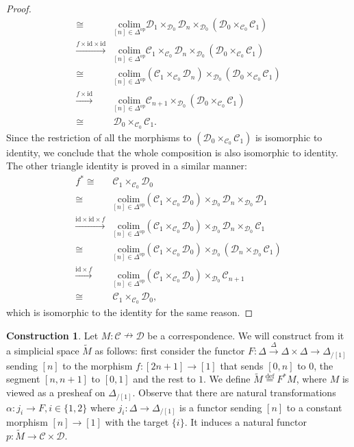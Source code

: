 \documentclass[a4paper, reqno]{amsart}
\theoremstyle{definition}
\newtheorem{construction}[theorem]{Construction}
\newcommand\cC{\mathscr C}
\newcommand\cD{\mathscr D}
\newcommand\id{\mathrm{id}}
\newcommand\op{\mathrm{op}}
\newcommand\colim{\mathrm{colim}}
\newcommand\bydef{\overset{\mathrm{def}}{=}}
\begin{document}
\begin{proof}
\begin{equation*}
\begin{split}
        \cong&\underset{[n]\in\Delta^\op}{\colim}\cD_1\times_{\cD_0}\cD_n\times_{\cD_0}(\cD_0\times_{\cC_0}\cC_1)\\
        \xrightarrow{f\times\id\times\id}&\underset{[n]\in\Delta^\op}{\colim}\cC_1\times_{\cC_0}\cD_n\times_{\cD_0}(\cD_0\times_{\cC_0}\cC_1)\\
        \cong&\underset{[n]\in\Delta^\op}{\colim}(\cC_1\times_{\cC_0}\cD_n)\times_{\cD_0}(\cD_0\times_{\cC_0}\cC_1)\\
        \xrightarrow{f\times\id}&\underset{[n]\in\Delta^\op}{\colim}\cC_{n+1}\times_{\cD_0}(\cD_0\times_{\cC_0}\cC_1)\\
        \cong &\cD_0\times_{\cC_0}\cC_1.
    \end{split}
\end{equation*}
Since the restriction of all the morphisms to $(\cD_0\times_{\cC_0}\cC_1)$ is isomorphic to identity, we conclude that the whole composition is also isomorphic to identity. The other triangle identity is proved in a similar manner:
\begin{equation*}
    \begin{split}
        f^*\cong&\cC_1\times_{\cC_0} \cD_0\\
        \cong&\underset{[n]\in\Delta^\op}{\colim}(\cC_1\times_{\cC_0} \cD_0)\times_{\cD_0}\cD_n\times_{\cD_0}\cD_1\\
        \xrightarrow{\id\times \id\times f}&\underset{[n]\in\Delta^\op}{\colim}(\cC_1\times_{\cC_0} \cD_0)\times_{\cD_0}\cD_n\times_{\cD_0}\cC_1\\
        \cong&\underset{[n]\in\Delta^\op}{\colim}(\cC_1\times_{\cC_0} \cD_0)\times_{\cD_0}(\cD_n\times_{\cD_0}\cC_1)\\
        \xrightarrow{\id\times f}&\underset{[n]\in\Delta^\op}{\colim}(\cC_1\times_{\cC_0} \cD_0)\times_{\cD_0}\cC_{n+1}\\
        \cong&\cC_1\times_{\cC_0} \cD_0,
    \end{split}
\end{equation*}
which is isomorphic to the identity for the same reason.
\end{proof}
\begin{construction}\label{constr:rfib}
Let $M:\cC\nrightarrow\cD$ be a correspondence. We will construct from it a simplicial space $\widetilde{M}$ as follows: first consider the functor $F:\Delta\xrightarrow{\Delta}\Delta\times\Delta\rightarrow\Delta_{/[1]}$ sending $[n]$ to the morphism $f:[2n+1]\rightarrow[1]$ that sends $[0,n]$ to $0$, the segment $[n,n+1]$ to $[0,1]$ and the rest to $1$. We define $\widetilde{M}\bydef F^*M$, where $M$ is viewed as a presheaf on $\Delta_{/[1]}$. Observe that there are natural transformations $\alpha:j_i\rightarrow F, i\in\{1,2\}$ where $j_i:\Delta\rightarrow\Delta_{/[1]}$ is a functor sending $[n]$ to a constant morphism $[n]\rightarrow[1]$ with the target $\{i\}$. It induces a natural functor $p:\widetilde{M}\rightarrow\cC\times \cD$. 
\end{construction}
\end{document}
